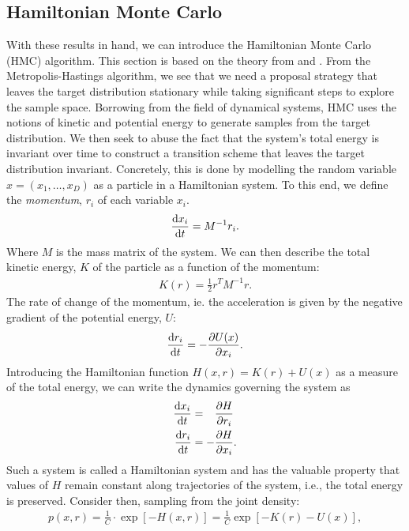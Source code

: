 \subsection{Hamiltonian Monte Carlo}

With these results in hand, we can introduce the Hamiltonian Monte Carlo (HMC) algorithm. 
This section is based on the theory from \autocite{bishop_pattern_2006} and \autocite{betancourt_conceptual_2018}.
From the Metropolis-Hastings algorithm, we see that we need a proposal strategy that leaves the target distribution stationary while taking significant steps to explore the sample space.
Borrowing from the field of dynamical systems, HMC uses the notions of kinetic and potential energy to generate samples from the target distribution. 
We then seek to abuse the fact that the system's total energy is invariant over time to construct a transition scheme that leaves the target distribution invariant.
Concretely, this is done by modelling the random variable $x=(x_1,\dots,x_D)$ as a particle in a Hamiltonian system.
To this end, we define the \emph{momentum}, $r_i$ of each variable $x_i$.
\begin{align}
    \dv{x_i}{t} = M^{-1} r_i.
\end{align}
Where $M$ is the mass matrix of the system.
We can then describe the total kinetic energy, $K$ of the particle as a function of the momentum:
\begin{align}
    K(r) = \frac{1}{2}r^T M^{-1} r.
\end{align}
The rate of change of the momentum, ie. the acceleration is given by the negative gradient of the potential energy, $U$:
\begin{align}
    \dv{r_i}{t} = -\pdv{U(x)}{x_i}.
\end{align}
Introducing the Hamiltonian function $H(x, r) = K(r) + U(x)$ as a measure of the total energy, we can write the dynamics governing the system as
\begin{equation}\label{eq:hmc-dynamics}
    \begin{aligned}
        \dv{x_i}{t} &= \phantom{-}\pdv{H}{r_i}\\
        \dv{r_i}{t} &= -\pdv{H}{x_i}.
    \end{aligned}
\end{equation}
Such a system is called a Hamiltonian system and has the valuable property that values of $H$ remain constant along trajectories of the system, i.e., the total energy is preserved.
Consider then, sampling from the joint density:
\begin{align} \label{eq:hmc-joint}
    p(x, r) =\frac{1}{C}\cdot  \exp\left[ -H(x, r)\right] = \frac{1}{C}\exp\left[-K(r) - U(x)  \right],
\end{align}
